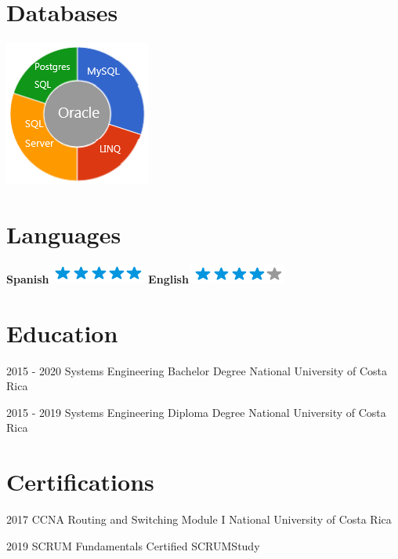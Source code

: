 \documentclass[]{friggeri-cv}
\begin{document}
\begin{aside}
  \section{Databases}
    \includegraphics[scale=0.62]{img/DB.png}
    ~
   \section{Languages}
    \textbf{Spanish}\includegraphics[scale=0.40]{img/5stars.png}
    \textbf{English}\includegraphics[scale=0.40]{img/4stars.png}
\end{aside}

\section{Education}
\begin{entrylist}
  \entry
    {2015 - 2020}
    {Systems Engineering Bachelor Degree}
    {National University of Costa Rica}
    
  \entry
    {2015 - 2019}
    {Systems Engineering Diploma Degree}
    {National University of Costa Rica}
    
\end{entrylist}

\section{Certifications}
\begin{entrylist}
  \entry
    {2017}
    {CCNA Routing and Switching Module I}
    {National University of Costa Rica}
    
    \entry
    {2019}
    {SCRUM Fundamentals Certified}
    {SCRUMStudy}
    
\end{entrylist}
\end{document}
